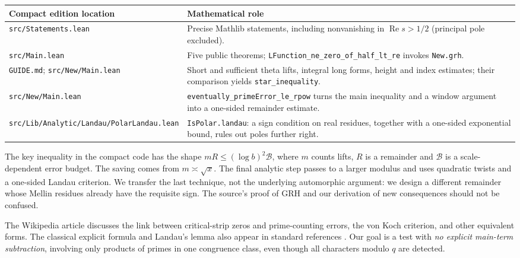 \documentclass[11pt]{article}
\theoremstyle{definition}\newtheorem{definition}[theorem]{Definition}
\newcommand{\Rea}{\operatorname{Re}}
\begin{document}
\begin{center}
\small
\begin{tabular}{@{}>{\raggedright\arraybackslash}p{.42\linewidth}>{\raggedright\arraybackslash}p{.51\linewidth}@{}}
\toprule
Compact edition location & Mathematical role \\
\midrule
\texttt{src/Statements.lean} & Precise Mathlib statements, including nonvanishing in $\Rea s>1/2$ (principal pole excluded). \\
\texttt{src/Main.lean} & Five public theorems; \texttt{LFunction\_ne\_zero\_of\_}\allowbreak\texttt{half\_lt\_re} invokes \texttt{New.grh}. \\
\texttt{GUIDE.md}; \texttt{src/New/Main.lean} & Short and sufficient theta lifts, integral long forms, height and index estimates; their comparison yields \texttt{star\_inequality}. \\
\texttt{src/New/Main.lean} & \texttt{eventually\_primeError\_le\_rpow} turns the main inequality and a window argument into a one-sided remainder estimate. \\
\texttt{src/Lib/Analytic/Landau/}\newline\texttt{PolarLandau.lean} & \texttt{IsPolar.landau}: a sign condition on real residues, together with a one-sided exponential bound, rules out poles further right. \\
\bottomrule
\end{tabular}
\end{center}
The key inequality in the compact code has the shape $mR\le (\log b)^2\mathcal B$, where $m$ counts lifts, $R$ is a remainder and $\mathcal B$ is a scale-dependent error budget. The saving comes from $m\asymp\sqrt{x}$. The final analytic step passes to a larger modulus and uses quadratic twists and a one-sided Landau criterion. We transfer the last technique, not the underlying automorphic argument: we design a different remainder whose Mellin residues already have the requisite sign. The source's proof of GRH and our derivation of new consequences should not be confused.

The Wikipedia article \cite{wiki} discusses the link between critical-strip zeros and prime-counting errors, the von Koch criterion, and other equivalent forms. The classical explicit formula and Landau's lemma also appear in standard references \cite{davenport,mv,dlmf}. Our goal is a test with \emph{no explicit main-term subtraction}, involving only products of primes in one congruence class, even though all characters modulo $q$ are detected.
\end{document}

